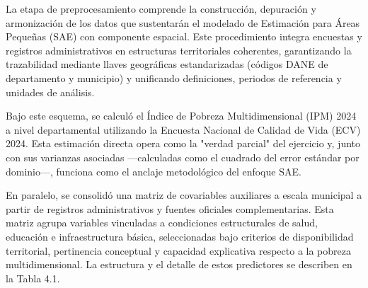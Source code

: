 La etapa de preprocesamiento comprende la construcción, depuración y armonización de los datos que sustentarán el modelado de Estimación para Áreas Pequeñas (SAE) con componente espacial. Este procedimiento integra encuestas y registros administrativos en estructuras territoriales coherentes, garantizando la trazabilidad mediante llaves geográficas estandarizadas (códigos DANE de departamento y municipio) y unificando definiciones, periodos de referencia y unidades de análisis.

Bajo este esquema, se calculó el Índice de Pobreza Multidimensional (IPM) 2024 a nivel departamental utilizando la Encuesta Nacional de Calidad de Vida (ECV) 2024. Esta estimación directa opera como la "verdad parcial" del ejercicio y, junto con sus varianzas asociadas —calculadas como el cuadrado del error estándar por dominio—, funciona como el anclaje metodológico del enfoque SAE.

En paralelo, se consolidó una matriz de covariables auxiliares a escala municipal a partir de registros administrativos y fuentes oficiales complementarias. Esta matriz agrupa variables vinculadas a condiciones estructurales de salud, educación e infraestructura básica, seleccionadas bajo criterios de disponibilidad territorial, pertinencia conceptual y capacidad explicativa respecto a la pobreza multidimensional. La estructura y el detalle de estos predictores se describen en la Tabla 4.1.

